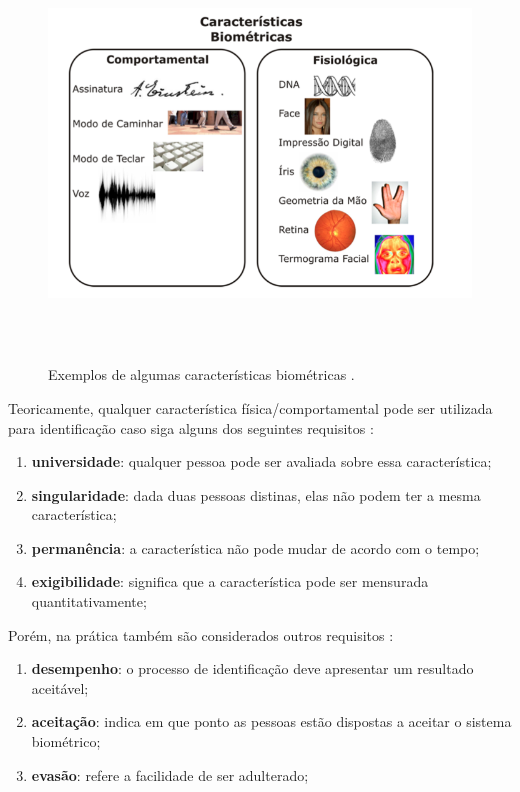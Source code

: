 	\begin{figure}[hbt]
		\begin{center}
			\includegraphics[height=11cm,width=17cm]{figuras/2.FundamentacaoTeorica/caracteristicasBiometricas.png}
		\end{center}
		\caption{Exemplos de algumas características biométricas \cite{drovetto}.}
		\label{caracteristicasBiometricas}
	\end{figure}

Teoricamente, qualquer característica física/comportamental pode ser utilizada para identificação caso siga alguns dos seguintes requisitos \cite{milene}: 

	\begin{enumerate}
		\item \textbf{universidade}: qualquer pessoa pode ser avaliada sobre essa característica;
		\item \textbf{singularidade}: dada duas pessoas distinas, elas não podem ter a mesma característica;
		\item \textbf{permanência}: a característica não pode mudar de acordo com o tempo;
		\item \textbf{exigibilidade}: significa que a característica pode ser mensurada quantitativamente;
	\end{enumerate}

Porém, na prática também são considerados outros requisitos \cite{milene}:

	\begin{enumerate}
		\item \textbf{desempenho}: o processo de identificação deve apresentar um resultado aceitável;
		\item \textbf{aceitação}: indica em que ponto as pessoas estão dispostas a aceitar o sistema biométrico;
		\item \textbf{evasão}: refere a facilidade de ser adulterado;
	\end{enumerate}

